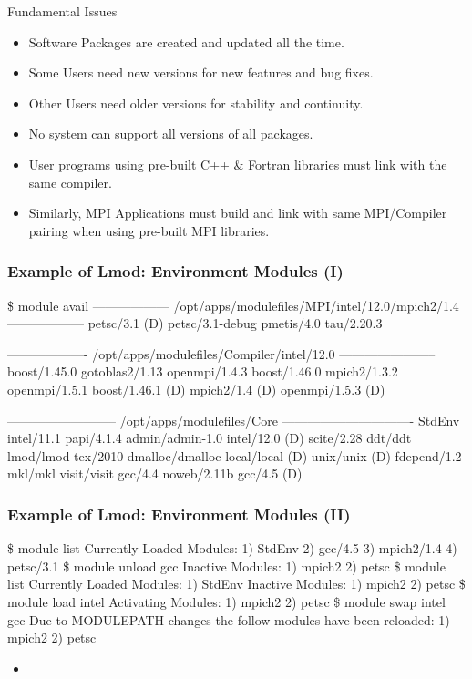 \documentclass{beamer}
\begin{document}
\begin{frame}{Fundamental Issues}
  \begin{itemize}
    \item Software Packages are created and updated all the time.
    \item Some Users need new versions for new features and bug fixes.
    \item Other Users need older versions for stability and continuity.
    \item No system can support all versions of all packages.
    \item User programs using pre-built C++ \& Fortran libraries must link with the same compiler.
    \item Similarly, MPI Applications must build and link with same
      MPI/Compiler pairing when using pre-built MPI libraries.
  \end{itemize}
\end{frame}

\begin{frame}[fragile]
    \frametitle{Example of Lmod: Environment Modules (I)}
    {\tiny
\begin{semiverbatim}
\$ {\color{blue} module avail}
------------------ /opt/apps/modulefiles/MPI/intel/12.0/mpich2/1.4 ------------------
  petsc/3.1 (D)    petsc/3.1-debug    pmetis/4.0    tau/2.20.3

------------------- /opt/apps/modulefiles/Compiler/intel/12.0 -----------------------
  boost/1.45.0        gotoblas2/1.13      openmpi/1.4.3
  boost/1.46.0        mpich2/1.3.2        openmpi/1.5.1
  boost/1.46.1 (D)    mpich2/1.4    (D)   openmpi/1.5.3   (D)

-------------------------- /opt/apps/modulefiles/Core -------------------------------
  StdEnv               intel/11.1         papi/4.1.4
  admin/admin-1.0      intel/12.0  (D)    scite/2.28
  ddt/ddt              lmod/lmod          tex/2010
  dmalloc/dmalloc      local/local (D)    unix/unix    (D)
  fdepend/1.2          mkl/mkl            visit/visit
  gcc/4.4              noweb/2.11b
  gcc/4.5        (D)
\end{semiverbatim}
    }
\end{frame}

\begin{frame}[fragile]
    \frametitle{Example of Lmod: Environment Modules (II)}
    {\tiny
\begin{semiverbatim}
{\color{blue}\$ module list}
Currently Loaded Modules:
  1) StdEnv  2) gcc/4.5  3) mpich2/1.4  4) petsc/3.1
{\color{blue}\$ module unload gcc}
Inactive Modules:
  1) mpich2  2) petsc
{\color{blue}\$ module list}
Currently Loaded Modules:
  1) StdEnv
Inactive Modules:
  1) mpich2  2) petsc
{\color{blue}\$ module load intel}
Activating Modules:
  1) mpich2  2) petsc
{\color{blue}\$ module swap intel gcc}
Due to MODULEPATH changes the follow modules have been reloaded:
  1) mpich2  2) petsc
\end{semiverbatim}
    }
\end{frame}

\begin{frame}{}
  \begin{itemize}
    \item 
  \end{itemize}
\end{frame}
\end{document}
